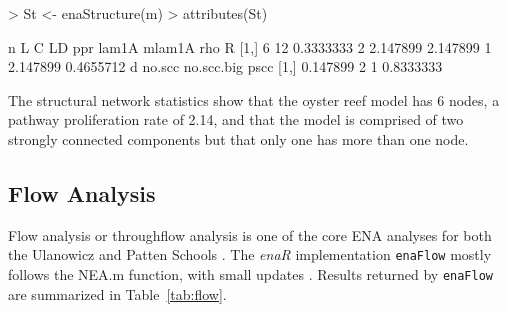 \documentclass[article]{jss}
\begin{document}
\begin{Schunk}
\begin{Sinput}
> St <- enaStructure(m)
> attributes(St)
\end{Sinput}
\begin{Soutput}
     n  L         C LD      ppr    lam1A mlam1A      rho         R
[1,] 6 12 0.3333333  2 2.147899 2.147899      1 2.147899 0.4655712
            d no.scc no.scc.big      pscc
[1,] 0.147899      2          1 0.8333333
\end{Soutput}
\end{Schunk}

The structural network statistics show that the oyster reef model has
6 nodes, a pathway proliferation rate of 2.14, and that the model is
comprised of two strongly connected components but that only one has
more than one node.

\subsection{Flow Analysis}
Flow analysis or throughflow analysis is one of the core ENA analyses
for both the Ulanowicz and Patten Schools \citep{fath99_review,
  fath06, schramski11}.  The \textit{enaR} implementation
\texttt{enaFlow} mostly follows the NEA.m function, with small updates
\cite[e.g. calculating the ratio of indirect-to-direct
flows][]{borrett11_ree,borrett11_equ}. Results returned by
\texttt{enaFlow} are summarized in Table~\ref{tab:flow}.
\end{document}
